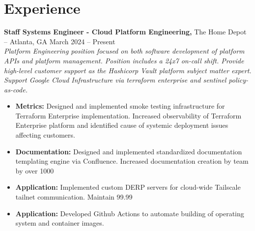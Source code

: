 \documentclass[11pt]{article}       %
\begin{document}
\section*{Experience}
\textbf{Staff Systems Engineer - Cloud Platform Engineering,} {The Home Depot} -- Atlanta, GA \hfill March 2024 -- Present \\
\vspace{-9pt}
\textit{Platform Engineering position focused on both software development of platform APIs and platform management. Position includes a 24x7 on-call shift. Provide high-level customer support as the Hashicorp Vault platform subject matter expert. Support Google Cloud Infrastructure via terraform enterprise and sentinel policy-as-code.}
\vspace{-4pt}
\begin{itemize}
  \item \textbf{Metrics:} Designed and implemented smoke testing infrastructure for Terraform Enterprise implementation. Increased observability of Terraform Enterprise platform and identified cause of systemic deployment issues affecting customers.
  \item \textbf{Documentation:} Designed and implemented standardized documentation templating engine via Confluence. Increased documentation creation by team by over 1000%
  \item \textbf{Application:} Implemented custom DERP servers for cloud-wide Tailscale tailnet communication. Maintain 99.99%
  \item \textbf{Application:} Developed Github Actions to automate building of operating system and container images.
\end{itemize}
\end{document}
